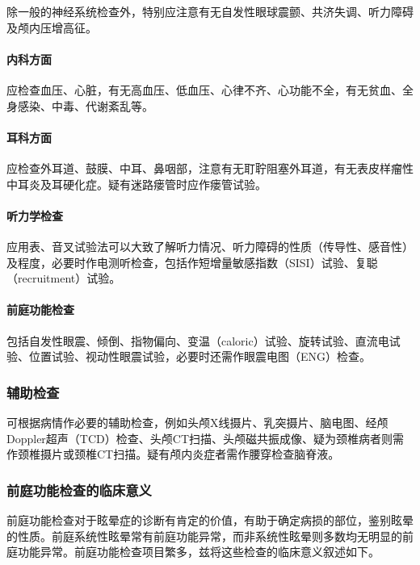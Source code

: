 除一般的神经系统检查外，特别应注意有无自发性眼球震颤、共济失调、听力障碍及颅内压增高征。

\paragraph{内科方面}

应检查血压、心脏，有无高血压、低血压、心律不齐、心功能不全，有无贫血、全身感染、中毒、代谢紊乱等。

\paragraph{耳科方面}

应检查外耳道、鼓膜、中耳、鼻咽部，注意有无耵聍阻塞外耳道，有无表皮样瘤性中耳炎及耳硬化症。疑有迷路瘘管时应作瘘管试验。

\paragraph{听力学检查}

应用表、音叉试验法可以大致了解听力情况、听力障碍的性质（传导性、感音性）及程度，必要时作电测听检查，包括作短增量敏感指数（SISI）试验、复聪（recruitment）试验。

\paragraph{前庭功能检查}

包括自发性眼震、倾倒、指物偏向、变温（caloric）试验、旋转试验、直流电试验、位置试验、视动性眼震试验，必要时还需作眼震电图（ENG）检查。

\subsubsection{辅助检查}

可根据病情作必要的辅助检查，例如头颅X线摄片、乳突摄片、脑电图、经颅Doppler超声（TCD）检查、头颅CT扫描、头颅磁共振成像、疑为颈椎病者则需作颈椎摄片或颈椎CT扫描。疑有颅内炎症者需作腰穿检查脑脊液。

\subsubsection{前庭功能检查的临床意义}

前庭功能检查对于眩晕症的诊断有肯定的价值，有助于确定病损的部位，鉴别眩晕的性质。前庭系统性眩晕常有前庭功能异常，而非系统性眩晕则多数均无明显的前庭功能异常。前庭功能检查项目繁多，兹将这些检查的临床意义叙述如下。

